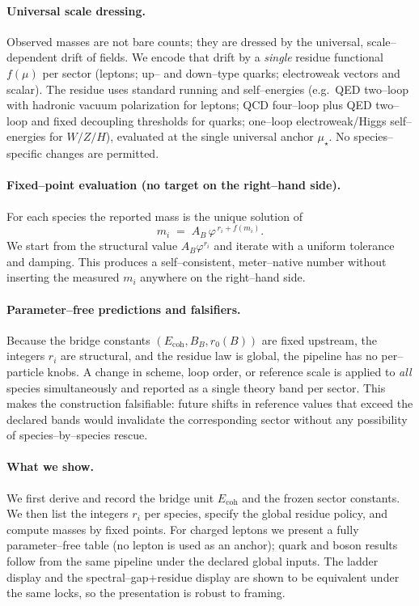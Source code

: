 \documentclass[epjc3]{svjour3}
\begin{document}
\paragraph{Universal scale dressing.}
Observed masses are not bare counts; they are dressed by the universal, scale–dependent drift of fields. We encode that drift by a \emph{single} residue functional $f(\mu)$ per sector (leptons; up– and down–type quarks; electroweak vectors and scalar). The residue uses standard running and self–energies (e.g.\ QED two–loop with hadronic vacuum polarization for leptons; QCD four–loop plus QED two–loop and fixed decoupling thresholds for quarks; one–loop electroweak/Higgs self–energies for $W/Z/H$), evaluated at the single universal anchor $\mu_\star$. No species–specific changes are permitted.

\paragraph{Fixed–point evaluation (no target on the right–hand side).}
For each species the reported mass is the unique solution of
\[
m_i \;=\; A_B\,\varphi^{\,r_i+f(m_i)}.
\]
We start from the structural value $A_B\varphi^{r_i}$ and iterate with a uniform tolerance and damping. This produces a self–consistent, meter–native number without inserting the measured $m_i$ anywhere on the right–hand side.

\paragraph{Parameter–free predictions and falsifiers.}
Because the bridge constants $(E_{\mathrm{coh}},B_B,r_0(B))$ are fixed upstream, the integers $r_i$ are structural, and the residue law is global, the pipeline has no per–particle knobs. A change in scheme, loop order, or reference scale is applied to \emph{all} species simultaneously and reported as a single theory band per sector. This makes the construction falsifiable: future shifts in reference values that exceed the declared bands would invalidate the corresponding sector without any possibility of species–by–species rescue.

\paragraph{What we show.}
We first derive and record the bridge unit $E_{\mathrm{coh}}$ and the frozen sector constants. We then list the integers $r_i$ per species, specify the global residue policy, and compute masses by fixed points. For charged leptons we present a fully parameter–free table (no lepton is used as an anchor); quark and boson results follow from the same pipeline under the declared global inputs. The ladder display and the spectral–gap+residue display are shown to be equivalent under the same locks, so the presentation is robust to framing.
\end{document}
